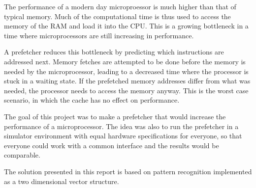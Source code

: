 The performance of a modern day microproessor is much higher than that of typical memory. Much of the computational time is thus used to access the memory of the RAM and load it into the CPU. This is a growing bottleneck in a time where microprocessors are still increasing in performance. 

A prefetcher reduces this bottleneck by predicting which instructions are addressed next. Memory fetches are attempted to be done before the memory is needed by the microprocessor, leading to a decreased time where the processor is stuck in a waiting state. If the prefetched memory addresses differ from what was needed, the processor needs to access the memory anyway. This is the worst case scenario, in which the cache has no effect on performance.

The goal of this project was to make a prefetcher that would increase the performance of a microprocessor. The idea was also to run the prefetcher in a simulator environment with equal hardware specifications for everyone, so that everyone could work with a common interface and the results would be comparable. 

The solution presented in this report is based on pattern recognition implemented as a two dimensional vector structure. 
